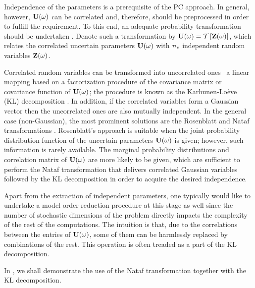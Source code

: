 Independence of the parameters is a prerequisite of the PC approach.
In general, however, $\mathbf{U}(\omega)$ can be correlated and, therefore, should be preprocessed in order to fulfill the requirement.
To this end, an adequate probability transformation should be undertaken \cite{eldred2008}.
Denote such a transformation by $\vU(\o) = \oTransform{\vZ(\o)}$, which relates the correlated uncertain parameters $\mathbf{U}(\omega)$ with ${n_\text{v}}$ independent random variables $\mathbf{Z}(\omega)$.

Correlated random variables can be transformed into uncorrelated ones \via\ a linear mapping based on a factorization procedure of the covariance matrix or covariance function of $\mathbf{U}(\omega)$; the procedure is known as the Karhunen-Lo\`{e}ve (KL) decomposition \cite{ghanem1991}.
In addition, if the correlated variables form a Gaussian vector then the uncorrelated ones are also mutually independent.
In the general case (non-Gaussian), the most prominent solutions are the Rosenblatt \cite{rosenblatt1952} and Nataf transformations \cite{li2008}.
Rosenblatt's approach is suitable when the joint probability distribution function of the uncertain parameters $\mathbf{U}(\omega)$ is given; however, such information is rarely available.
The marginal probability distributions and correlation matrix of $\mathbf{U}(\omega)$ are more likely to be given, which are sufficient to perform the Nataf transformation that delivers correlated Gaussian variables followed by the KL decomposition in order to acquire the desired independence.

Apart from the extraction of independent parameters, one typically would like to undertake a model order reduction procedure at this stage as well since the number of stochastic dimensions of the problem directly impacts the complexity of the rest of the computations.
The intuition is that, due to the correlations between the entries of $\mathbf{U}(\omega)$, some of them can be harmlessly replaced by combinations of the rest. This operation is often treaded as a part of the KL decomposition.

In , we shall demonstrate the use of the Nataf transformation together with the KL decomposition.
